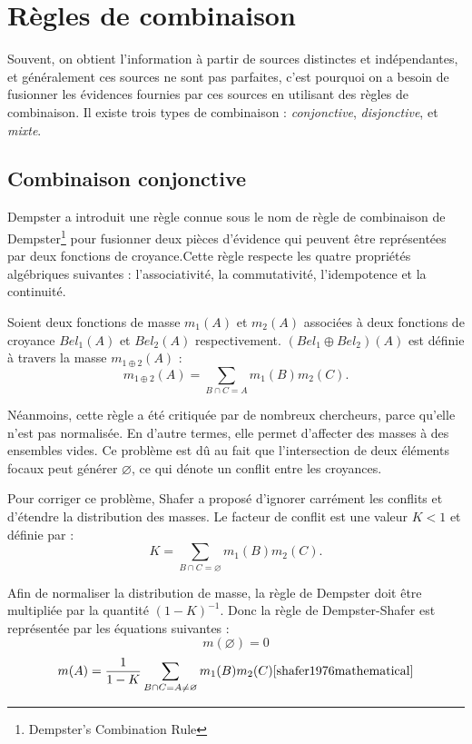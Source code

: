 \section{Règles de combinaison}

Souvent, on obtient l’information à partir de sources distinctes et indépendantes,
et généralement ces sources ne sont pas parfaites, c’est pourquoi on a besoin de
fusionner les évidences fournies par ces sources en utilisant des règles de
combinaison. Il existe trois types de combinaison : \emph{conjonctive},
\emph{disjonctive}, et \emph{mixte}.

\subsection{Combinaison conjonctive}

Dempster a introduit une règle connue sous le nom de règle de combinaison
de Dempster\footnote{Dempster's Combination Rule} pour fusionner deux pièces
d’évidence qui peuvent être représentées par deux fonctions de croyance.Cette
règle respecte les quatre propriétés algébriques suivantes : l’associativité,
la commutativité, l’idempotence et la continuité.\cite{sentz2002combination}

Soient deux fonctions de masse $m_1(A)$ et $m_2(A)$ associées à deux fonctions
de croyance $Bel_1(A)$ et $Bel_2(A)$ respectivement. $(Bel_1 \oplus Bel_2)(A)$
est définie à travers la masse $m_{1 \oplus 2}(A)$ :
\begin{equation}
m_{1 \oplus 2}(A) = \sum_{B \cap C = A} m_1(B) m_2(C).
\end{equation}

Néanmoins, cette règle a été critiquée par de nombreux chercheurs, parce qu’elle
n’est pas normalisée. En d’autre termes, elle permet d’affecter des masses à
des ensembles vides. Ce problème est dû au fait que l’intersection de deux
éléments focaux peut générer $\varnothing$, ce qui dénote un conflit entre les croyances.

Pour corriger ce problème, Shafer a proposé d’ignorer carrément les conflits
et d'étendre la distribution des masses. Le facteur de conflit est une valeur
$K < 1$ et définie par :
\begin{equation}
K = \sum_{B \cap C = \varnothing} m_1(B) m_2(C).
\end{equation}

Afin de normaliser la distribution de masse, la règle de Dempster doit être
multipliée par la quantité $(1 - K)^{-1}$. Donc la règle de Dempster-Shafer
est représentée par les équations suivantes :
\begin{equation}
m(\varnothing) = 0
\end{equation}
\begin{equation}
m(A) = \frac{1}{1-K} \sum_{B \cap C = A \neq \varnothing} m_1(B) m_2(C) \cite{shafer1976mathematical}
\end{equation}


